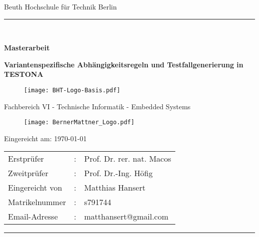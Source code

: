 \begin{titlepage}
	\begin{center}
		\Large
		Beuth Hochschule für Technik Berlin
		\textcolor{darkBHT}{\rule{\textwidth}{0.2cm}} \\
		\vspace{2 cm}
		
		\Large		
		\textbf{Masterarbeit}
		
		\huge
		\textbf{Variantenspezifische Abhängigkeitsregeln und Testfallgenerierung in TESTONA\\}

		\vspace{2cm}
		
		\begin{figure}[htbp]
			\centering 
			\texttt{[image: BHT-Logo-Basis.pdf]}  
		\end{figure}

\Large
Fachbereich VI - Technische Informatik - Embedded Systems
		
		\vspace{1cm}		

		\begin{figure}[htbp]
			\centering 
			\texttt{[image: BernerMattner\_Logo.pdf]}  
		\end{figure}		
		
		\vspace{1cm}
		
		\begin{center}
		Eingereicht am: \today
		\end{center}
		
		\begin{tabular}{lll}
			Erstprüfer    &: &Prof.  Dr. rer. nat. Macos \\
			Zweitprüfer   &: &Prof.  Dr.-Ing. Höfig\\
			Eingereicht von&: &Matthias Hansert \\
			Matrikelnummer&:  &s791744\\
			Email-Adresse &: &matthansert@gmail.com\\
		\end{tabular}
		
		\date{\today}
		
	\end{center}
	\vfill
	\textcolor{darkBHT}{\rule{\textwidth}{0.2cm}}
	\normalsize
	
	\newpage
\end{titlepage}